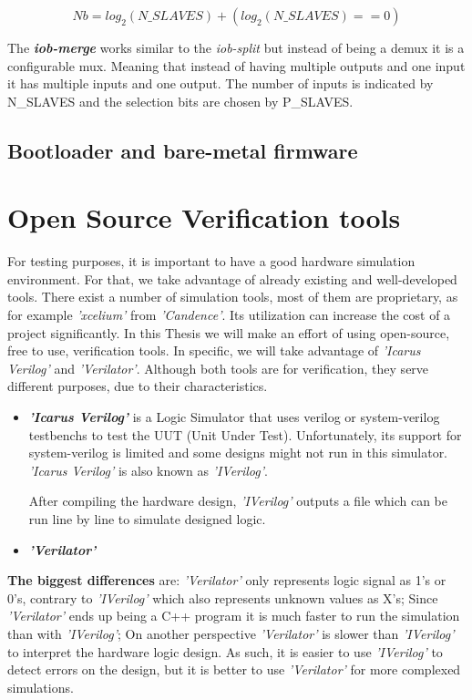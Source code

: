 \begin{equation}
    \label{eq:number_bits}
    Nb = log_2(N\_SLAVES)+(log_2(N\_SLAVES)==0)
\end{equation}

The \textbf{\textit{iob-merge}} works similar to the \textit{iob-split} but instead of being a \acrshort{demux} it is a configurable \acrfull{mux}. Meaning that instead of having multiple outputs and one input it has multiple inputs and one output. The number of inputs is indicated by N\_SLAVES and the selection bits are chosen by P\_SLAVES.

\subsection{Bootloader and bare-metal firmware}

\section{Open Source Verification tools}
\label{section:verification_tools}
For testing purposes, it is important to have a good hardware simulation environment. For that, we take advantage of already existing and well-developed tools. There exist a number of simulation tools, most of them are proprietary, as for example \textit{'xcelium'} from \textit{'Candence'}. Its utilization can increase the cost of a project significantly. In this Thesis we will make an effort of using open-source, free to use, verification tools. In specific, we will take advantage of \textit{'Icarus Verilog'} and \textit{'Verilator'}. Although both tools are for verification, they serve different purposes, due to their characteristics.

\begin{itemize}
    \item \textbf{\textit{'Icarus Verilog'}} is a Logic Simulator that uses verilog or system-verilog testbenchs to test the UUT (Unit Under Test). Unfortunately, its support for system-verilog is limited and some designs might not run in this simulator. \textit{'Icarus Verilog'} is also known as \textit{'IVerilog'}.
    
    After compiling the hardware design, \textit{'IVerilog'} outputs a file which can be run line by line to simulate designed logic.
    
    \item \textbf{\textit{'Verilator'}}
\end{itemize}

\textbf{The biggest differences} are: \textit{'Verilator'} only represents logic signal as 1's or 0's, contrary to \textit{'IVerilog'} which also represents unknown values as X's; Since \textit{'Verilator'} ends up being a C++ program it is much faster to run the simulation than with \textit{'IVerilog'}; On another perspective \textit{'Verilator'} is slower than \textit{'IVerilog'} to interpret the hardware logic design.
As such, it is easier to use \textit{'IVerilog'} to detect errors on the design, but it is better to use \textit{'Verilator'} for more complexed simulations.

